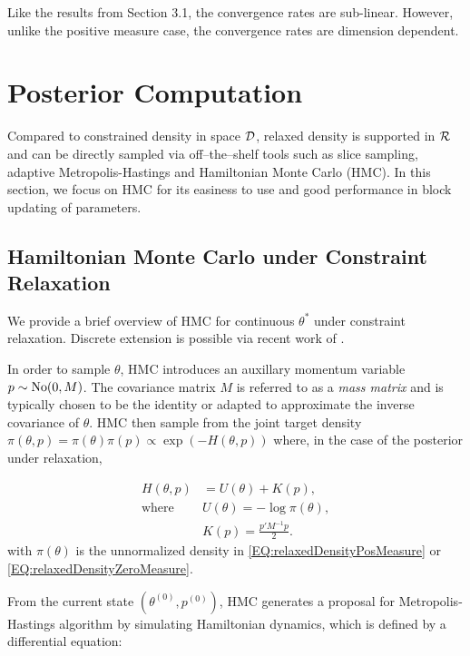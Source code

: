 \documentclass[10pt,fleqn]{article} \pdfoutput=1
\DeclareMathOperator{\1}{\mathbbm{1}} \DeclareMathOperator{\bigO}{\mc O}
\newcommand{\mass}{M} %
\begin{document}
Like the results from Section 3.1, the convergence rates are sub-linear.
However, unlike the positive measure case, the convergence rates are
dimension dependent.


\section{Posterior Computation}

Compared to constrained density in  space $\mathcal{D}$, relaxed density is supported in $\mathcal{R}$ and can be directly 
sampled via off--the--shelf tools such as slice
sampling, adaptive Metropolis-Hastings and Hamiltonian Monte Carlo (HMC).
In this section, we focus on HMC for its easiness to use and good
performance in block updating of parameters.

\subsection{Hamiltonian Monte Carlo under Constraint Relaxation}

We provide a brief overview of HMC for continuous $\theta^*$ under
constraint relaxation. Discrete extension is possible via recent work of
\cite{nishimura2017discontinuous}.

In order to sample $\theta$, HMC introduces an auxillary momentum variable $p
	\sim \No(0, \mass)$. The covariance matrix $\mass$ is referred to as a
\textit{mass matrix} and is typically chosen to be the identity or adapted
to approximate the inverse covariance of $\theta$. HMC then sample from the
joint target density $\pi(\theta, p) = \pi(\theta) \pi(p) \propto \exp (- H(\theta, p))$
where, in the case of the posterior under relaxation,


\begin{equation} \begin{aligned}
		H(\theta, p) & = U(\theta)+K(p), \\ \text{where } &
		U(\theta) = -\log\pi(\theta),    \\ & K(p) = \frac{p'\mass^{-1} p}{2}.
	\end{aligned}
\end{equation}
with $\pi(\theta)$ is the unnormalized density in \eqref{EQ:relaxedDensityPosMeasure} or \eqref{EQ:relaxedDensityZeroMeasure}.

From the current state $(\theta^{(0)},p^{(0)})$, HMC generates a proposal for
Metropolis-Hastings algorithm by simulating Hamiltonian dynamics, which is
defined by a differential equation:
\end{document}
